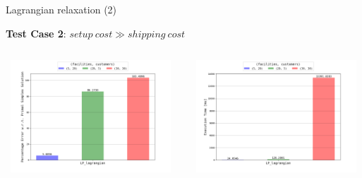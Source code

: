 \documentclass{beamer}
\begin{document}
	   \begin{frame}{Lagrangian relaxation (2)}
	    
        \textbf{Test Case 2}: $setup \ cost \gg shipping \ cost$
        
        \begin{columns}
	   \centering
        \includegraphics[width=6.5cm,height=4.2cm]{img/chart_error_lagrangian_1.png}
        
        \centering
        \includegraphics[width=6.5cm,height=4.2cm]{img/chart_time_lagrangian_1.png}
        \end{columns}
        
	    \end{frame}
	    
\end{document}
